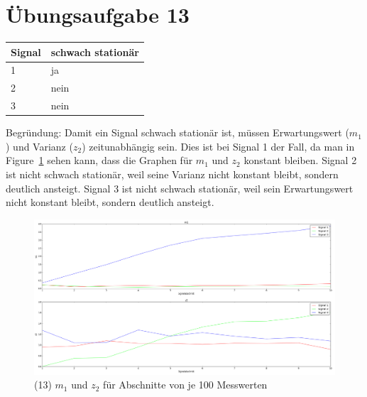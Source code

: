 
    
    \section*{Übungsaufgabe 13}
    \begin{tabular}{ | l | l | }
        \hline
        Signal & schwach stationär \\ \hline
        1 & ja \\ \hline
        2 & nein \\ \hline
        3 & nein \\ \hline
    \end{tabular}
    \newline \newline
    Begründung: \newline
    Damit ein Signal schwach stationär ist, müssen Erwartungswert ($m_1$) und Varianz ($z_2$) zeitunabhängig sein.
    Dies ist bei Signal 1 der Fall, da man in Figure~\ref{fig:m1_z2_plt} sehen kann, dass die Graphen für $m_1$ und $z_2$ konstant bleiben.
    Signal 2 ist nicht schwach stationär, weil seine Varianz nicht konstant bleibt, sondern deutlich ansteigt.
    Signal 3 ist nicht schwach stationär, weil sein Erwartungswert nicht konstant bleibt, sondern deutlich ansteigt.

    \begin{figure}
        \includegraphics[width=1.0\textwidth]{A13.png}
        \caption{(13) $m_1$ und $z_2$ für Abschnitte von je 100 Messwerten}
        \label{fig:m1_z2_plt}
    \end{figure}
\newpage
